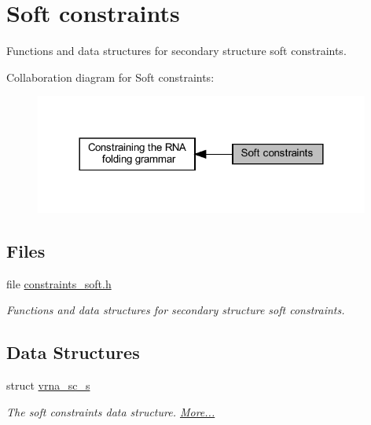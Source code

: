 \hypertarget{group__soft__constraints}{}\section{Soft constraints}
\label{group__soft__constraints}


Functions and data structures for secondary structure soft constraints.  


Collaboration diagram for Soft constraints\+:
\nopagebreak
\begin{figure}[H]
\begin{center}
\leavevmode
\includegraphics[width=312pt]{group__soft__constraints}
\end{center}
\end{figure}
\subsection*{Files}
\begin{DoxyCompactItemize}
\item 
file \hyperlink{constraints__soft_8h}{constraints\+\_\+soft.\+h}
\begin{DoxyCompactList}\small\item\em Functions and data structures for secondary structure soft constraints. \end{DoxyCompactList}\end{DoxyCompactItemize}
\subsection*{Data Structures}
\begin{DoxyCompactItemize}
\item 
struct \hyperlink{group__soft__constraints_structvrna__sc__s}{vrna\+\_\+sc\+\_\+s}
\begin{DoxyCompactList}\small\item\em The soft constraints data structure.  \hyperlink{group__soft__constraints_structvrna__sc__s}{More...}\end{DoxyCompactList}\end{DoxyCompactItemize}
